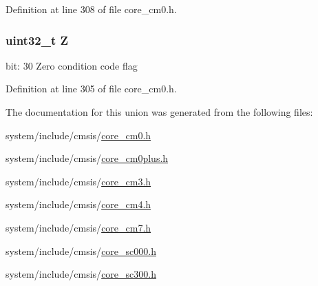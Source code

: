 Definition at line 308 of file core\+\_\+cm0.\+h.

\subsubsection[{\texorpdfstring{Z}{Z}}]{\setlength{\rightskip}{0pt plus 5cm}uint32\+\_\+t Z}\hypertarget{unionx_p_s_r___type_a5ae954cbd9986cd64625d7fa00943c8e}{}\label{unionx_p_s_r___type_a5ae954cbd9986cd64625d7fa00943c8e}
bit\+: 30 Zero condition code flag 

Definition at line 305 of file core\+\_\+cm0.\+h.



The documentation for this union was generated from the following files\+:\begin{DoxyCompactItemize}
\item 
system/include/cmsis/\hyperlink{core__cm0_8h}{core\+\_\+cm0.\+h}\item 
system/include/cmsis/\hyperlink{core__cm0plus_8h}{core\+\_\+cm0plus.\+h}\item 
system/include/cmsis/\hyperlink{core__cm3_8h}{core\+\_\+cm3.\+h}\item 
system/include/cmsis/\hyperlink{core__cm4_8h}{core\+\_\+cm4.\+h}\item 
system/include/cmsis/\hyperlink{core__cm7_8h}{core\+\_\+cm7.\+h}\item 
system/include/cmsis/\hyperlink{core__sc000_8h}{core\+\_\+sc000.\+h}\item 
system/include/cmsis/\hyperlink{core__sc300_8h}{core\+\_\+sc300.\+h}\end{DoxyCompactItemize}
